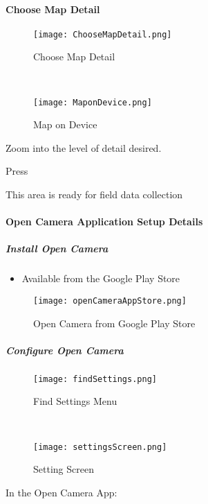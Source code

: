  \vspace{.5in}


  \lookArrow
 \vspace{.2in}

 \clearpage
 \paragraph[Choose Map Detail]{Choose Map Detail\texorpdfstring{\\}{}}
 \begin{wrapfigure}{r}{0.5\textwidth}
 \centering
     \texttt{[image: ChooseMapDetail.png]}
 \caption{Choose Map Detail}
 \vspace{.25in}

 \HRule \\[.4cm] %
 \vspace{.25in}

     \texttt{[image: MaponDevice.png]}
 \caption{Map on Device}
 \end{wrapfigure}
 Zoom into the level of detail desired.
 \vspace{1in}

 \noindent Press  \lookArrow
 \vspace{3.5in}

 \noindent This area is ready for field data collection \lookArrow
 \clearpage
 \paragraph{Open Camera Application Setup Details}
 \subparagraph{Install Open Camera}
 \begin{itemize}
 \item Available from the Google Play Store
 \end{itemize}
 \begin{figure}[h!]
 \centering
     \texttt{[image: openCameraAppStore.png]}
 \caption{Open Camera from Google Play Store}
 \end{figure}

 \clearpage
 \subparagraph{Configure Open Camera}
 \begin{wrapfigure}{r}{0.5\textwidth}
 \centering
     \texttt{[image: findSettings.png]}
 \caption{Find Settings Menu}
 \vspace{.25in}

 \HRule \\[.4cm] %
 \vspace{.25in}

     \texttt{[image: settingsScreen.png]}
 \caption{Setting Screen}
 \end{wrapfigure}
 In the Open Camera App:
 \vspace{2.5in}

